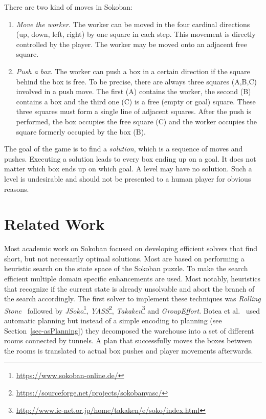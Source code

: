 \documentclass[runningheads]{llncs}
\begin{document}
There are two kind of moves in Sokoban:
\begin{enumerate}
\item \emph{Move the worker.} The worker can be moved in the four cardinal directions (up, down, left, right)
by one square in each step.
This movement is directly controlled by the player. The worker may be moved onto an adjacent free square.
\item \emph{Push a box.} The worker can push a box in a certain direction if the square behind the box is free.
To be precise, there are always three squares (A,B,C) involved in a push move. The first (A) contains the worker, the
second (B) contains a box and the third one (C) is a free (empty or goal) square.
These three squares must form a single
line of adjacent squares. After the push is performed, the box occupies the free square (C) and the worker occupies
the square formerly occupied by the box (B).
\end{enumerate}

The goal of the game is to find a \emph{solution}, which
is a sequence of moves and pushes. Executing a solution leads to every box
ending up on a goal. It does not matter which box ends up on which goal.
A level may have no solution. Such a level is undesirable and should not be presented to a human player
for obvious reasons.

\section{Related Work}
\label{sec-related}
Most academic work on Sokoban focused on developing efficient solvers that find short, but not necessarily optimal solutions. Most are based on performing a heuristic search on the state space of the Sokoban puzzle. To make the search efficient multiple domain specific enhancements are used. Most notably, heuristics that recognize if the current state is already unsolvable and abort the branch of the search accordingly. The first solver to implement these techniques was \emph{Rolling Stone}~\cite{junghanns98} followed by
\emph{JSoko}\footnote{\url{https://www.sokoban-online.de/}},
\emph{YASS}\footnote{\url{https://sourceforge.net/projects/sokobanyasc/}},
\emph{Takaken}\footnote{\url{http://www.ic-net.or.jp/home/takaken/e/soko/index.html}} and
\emph{GroupEffort}\cite{froleyksUsingAlgorithmPortfolio2017}.
Botea et al.~\cite{botea03} used automatic planning but instead of a simple encoding to planning (see Section~\ref{sec-asPlanning}) they decomposed the warehouse into a set of different rooms connected by tunnels. A plan that successfully moves the boxes between the rooms is translated to actual box pushes and player movements afterwards.
\end{document}
